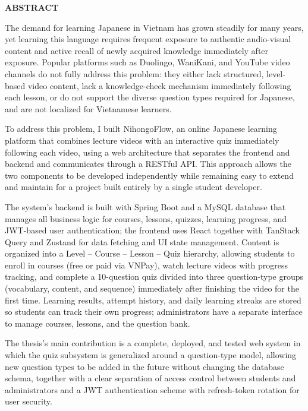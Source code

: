 \documentclass[../DoAn.tex]{subfiles}
\begin{document}
\begin{center}
    \Large{\textbf{ABSTRACT}}\\
\end{center}
\vspace{1cm}
The demand for learning Japanese in Vietnam has grown steadily for many years, yet learning this language requires frequent exposure to authentic audio-visual content and active recall of newly acquired knowledge immediately after exposure. Popular platforms such as Duolingo, WaniKani, and YouTube video channels do not fully address this problem: they either lack structured, level-based video content, lack a knowledge-check mechanism immediately following each lesson, or do not support the diverse question types required for Japanese, and are not localized for Vietnamese learners.

To address this problem, I built NihongoFlow, an online Japanese learning platform that combines lecture videos with an interactive quiz immediately following each video, using a web architecture that separates the frontend and backend and communicates through a RESTful API. This approach allows the two components to be developed independently while remaining easy to extend and maintain for a project built entirely by a single student developer.

The system's backend is built with Spring Boot and a MySQL database that manages all business logic for courses, lessons, quizzes, learning progress, and JWT-based user authentication; the frontend uses React together with TanStack Query and Zustand for data fetching and UI state management. Content is organized into a Level -- Course -- Lesson -- Quiz hierarchy, allowing students to enroll in courses (free or paid via VNPay), watch lecture videos with progress tracking, and complete a 10-question quiz divided into three question-type groups (vocabulary, content, and sequence) immediately after finishing the video for the first time. Learning results, attempt history, and daily learning streaks are stored so students can track their own progress; administrators have a separate interface to manage courses, lessons, and the question bank.

The thesis's main contribution is a complete, deployed, and tested web system in which the quiz subsystem is generalized around a question-type model, allowing new question types to be added in the future without changing the database schema, together with a clear separation of access control between students and administrators and a JWT authentication scheme with refresh-token rotation for user security.
\end{document}
